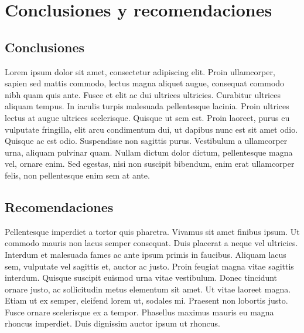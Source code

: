 \documentclass[letterpaper,oneside,openany,11pt]{book}
\begin{document}
\chapter{Conclusiones y recomendaciones}\label{cap.conclusiones}
\section{Conclusiones}
\noindent Lorem ipsum dolor sit amet, consectetur adipiscing elit. Proin ullamcorper, sapien sed mattis commodo, lectus magna aliquet augue, consequat commodo nibh quam quis ante. Fusce et elit ac dui ultrices ultricies. Curabitur ultrices aliquam tempus. In iaculis turpis malesuada pellentesque lacinia. Proin ultrices lectus at augue ultrices scelerisque. Quisque ut sem est. Proin laoreet, purus eu vulputate fringilla, elit arcu condimentum dui, ut dapibus nunc est sit amet odio. Quisque ac est odio. Suspendisse non sagittis purus. Vestibulum a ullamcorper urna, aliquam pulvinar quam. Nullam dictum dolor dictum, pellentesque magna vel, ornare enim. Sed egestas, nisi non suscipit bibendum, enim erat ullamcorper felis, non pellentesque enim sem at ante. \\

\section{Recomendaciones}
\noindent Pellentesque imperdiet a tortor quis pharetra. Vivamus sit amet finibus ipsum. Ut commodo mauris non lacus semper consequat. Duis placerat a neque vel ultricies. Interdum et malesuada fames ac ante ipsum primis in faucibus. Aliquam lacus sem, vulputate vel sagittis et, auctor ac justo. Proin feugiat magna vitae sagittis interdum. Quisque suscipit euismod urna vitae vestibulum. Donec tincidunt ornare justo, ac sollicitudin metus elementum sit amet. Ut vitae laoreet magna. Etiam ut ex semper, eleifend lorem ut, sodales mi. Praesent non lobortis justo. Fusce ornare scelerisque ex a tempor. Phasellus maximus mauris eu magna rhoncus imperdiet. Duis dignissim auctor ipsum ut rhoncus. \\



\cleardoublepage
{}

\end{document}
